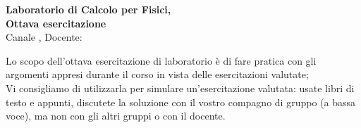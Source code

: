 \documentclass[11pt]{article}
\begin{document}
\pagestyle{empty}

\begin{center}
{\Large \bf  Laboratorio di Calcolo per Fisici,\\ Ottava esercitazione \\[2mm]}
{\large Canale \canale, Docente: \docente}
\end{center}
\vspace{4mm}

\begin{mdframed}[backgroundcolor=gray!10]
Lo scopo dell'ottava esercitazione di laboratorio è di fare pratica con
gli argomenti appresi durante il corso in vista delle esercitazioni valutate;\\
Vi consigliamo di utilizzarla per simulare un'esercitazione valutata: usate libri di testo e appunti,
discutete la soluzione con il vostro compagno di gruppo (a bassa voce), ma non con gli altri gruppi o con il docente.
  \end{mdframed}
%
%
\end{document}
